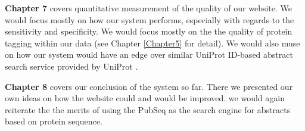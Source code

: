 \textbf{Chapter 7} covers quantitative measurement of the quality of our website. We would focus mostly on how our system performs, especially with regards to the sensitivity and specificity. We would focus mostly on the the quality of protein tagging within our data (see Chapter \ref{Chapter5} for detail). We would also muse on how our system would have an edge over similar UniProt ID-based abstract search service provided by UniProt \citep{uniprot2008universal} \citep{Uniprot2011} \citep{UniprotOnline}.


\textbf{Chapter 8} covers our conclusion of the system so far. There we presented our own ideas on how the website could and would be improved. we would again reiterate the the merits of using the PubSeq as the search engine for abstracts based on protein sequence.

